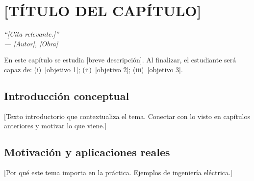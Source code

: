 
\chapter{[TÍTULO DEL CAPÍTULO]}
\label{ch:[etiqueta]}

\begin{flushright}
  \itshape
  ``[Cita relevante.]''\\[2pt]
  \normalfont\small --- [Autor], \textit{[Obra]}
\end{flushright}

\bigskip

En este capítulo se estudia [breve descripción]. Al finalizar, el estudiante
será capaz de: (i)~[objetivo 1]; (ii)~[objetivo 2]; (iii)~[objetivo 3].

\section{Introducción conceptual}
\label{sec:[etiqueta]-intro}

[Texto introductorio que contextualiza el tema. Conectar con lo visto en
capítulos anteriores y motivar lo que viene.]

\section{Motivación y aplicaciones reales}
\label{sec:[etiqueta]-aplicaciones}

[Por qué este tema importa en la práctica. Ejemplos de ingeniería eléctrica.]

\begin{aplicacion}
\end{aplicacion}

